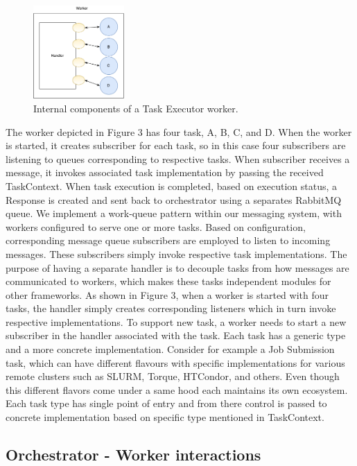 \documentclass[review]{elsarticle}
\begin{document}
\begin{figure}
\includegraphics[height=1.4in, width=2.3 in]{figures/figure3.pdf}
\caption{Internal components of a Task Executor worker.}
\end{figure}

The worker depicted in Figure 3 has four task, A, B, C, and D. When the worker is started, it creates subscriber for each task, so in this case four subscribers are listening to queues corresponding to respective tasks. When subscriber receives a message, it invokes associated task implementation by passing the received TaskContext. When task execution is completed, based on execution status, a Response is created and sent back to orchestrator using a separates RabbitMQ queue.    
We implement a work-queue pattern within our messaging system, with workers configured to serve one or more tasks. Based on configuration, corresponding message queue subscribers are employed to listen to incoming messages. These subscribers simply invoke respective task implementations. The purpose of having a separate handler is to decouple tasks from how messages are communicated to workers, which makes these tasks independent modules for other frameworks. As shown in Figure 3, when a worker is started with four tasks, the handler simply creates corresponding listeners which in turn invoke respective implementations. To support new task, a worker needs to start a new subscriber in the handler associated with the task. 
Each task has a generic type and a more concrete implementation. Consider for example a Job Submission task, which can have different flavours with specific implementations for various remote clusters such as SLURM, Torque, HTCondor, and others. Even though this different flavors come under a same hood each maintains its own ecosystem. Each task type has single point of entry and from there control is passed to concrete implementation based on specific type mentioned in TaskContext. 

\subsection{Orchestrator - Worker interactions}
\end{document}
